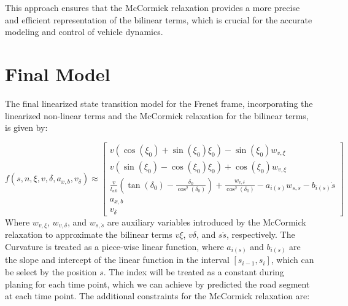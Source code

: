 This approach ensures that the McCormick relaxation provides a more precise and efficient representation of the bilinear terms, which is crucial for
the accurate modeling and control of vehicle dynamics.

\section{Final Model}

The final linearized state transition model for the Frenet frame, incorporating the linearized non-linear terms and the McCormick relaxation for the bilinear terms, is given by:

\begin{equation}
	f(s, n, \xi, v, \delta, a_{x,b}, v_\delta )\approx
	\begin{bmatrix}
		v (\cos(\xi_0) + \sin(\xi_0)\xi_0) - \sin(\xi_0) w_{v,\xi}                                                                                                 \\[8pt]
		v (\sin(\xi_0) - \cos(\xi_0)\xi_0) + \cos(\xi_0) w_{v,\xi}                                                                                                 \\[8pt]
		\frac{v}{l_{wb}} (\tan(\delta_0) - \frac{\delta_0}{\cos^2(\delta_0)}) + \frac{w_{v,\delta}}{\cos^2(\delta_0)}  - a_{i(s)} w_{s,\dot{s}} - b_{i(s)} \dot{s} \\[8pt]
		a_{x,b}                                                                                                                                                    \\[8pt]
		v_\delta
	\end{bmatrix}
\end{equation}
Where $w_{v,\xi}$, $w_{v,\delta}$, and $w_{s,\dot{s}}$ are auxiliary variables introduced by the McCormick relaxation to approximate the bilinear
terms $v\xi$, $v\delta$, and $s\dot{s}$, respectively.
The Curvature is treated as a piece-wise linear function, where $a_{i(s)}$ and $b_{i(s)}$ are the slope and intercept of the linear function in the
interval $[s_{i-1}, s_i]$, which can be select by the position $s$.
The index will be treated as a constant during planing for each time point, which we can achieve by predicted the road segment at each time point.
The additional constraints for the McCormick relaxation are:
